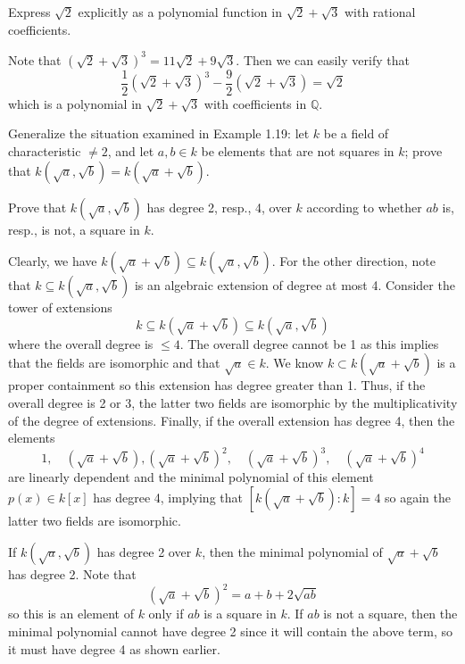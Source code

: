 \documentclass[../../master.tex]{subfiles}
\begin{document}
\begin{problem}
    Express $\sqrt{2}$ explicitly as a polynomial function in $\sqrt{2} + \sqrt{3}$ with rational coefficients.
\end{problem}

\begin{solution}
    Note that $(\sqrt{2} + \sqrt{3})^3 = 11\sqrt{2} + 9\sqrt{3}$.
    Then we can easily verify that
    \[
        \frac{1}{2} (\sqrt{2} + \sqrt{3})^3 - \frac{9}{2} (\sqrt{2} + \sqrt{3}) = \sqrt{2}
    \]
    which is a polynomial in $\sqrt{2} + \sqrt{3}$ with coefficients in $\mathbb{Q}$.
\end{solution}

\begin{problem}
    Generalize the situation examined in Example 1.19:
    let $k$ be a field of characteristic $\neq 2$, and let $a, b \in k$ be elements that are not squares in $k$;
    prove that $k(\sqrt{a}, \sqrt{b}) = k(\sqrt{a} + \sqrt{b})$.

    Prove that $k(\sqrt{a}, \sqrt{b})$ has degree 2, resp., 4, over $k$ according to whether $ab$ is, resp., is not, a square in $k$.
\end{problem}

\begin{solution}
    Clearly, we have $k(\sqrt{a} + \sqrt{b}) \subseteq k(\sqrt{a}, \sqrt{b})$.
    For the other direction, note that $k \subseteq k(\sqrt{a}, \sqrt{b})$ is an algebraic extension of degree at most 4.
    Consider the tower of extensions 
    \[
    k \subseteq k(\sqrt{a} + \sqrt{b}) \subseteq k(\sqrt{a}, \sqrt{b})
    \]
    where the overall degree is $\leq 4$.
    The overall degree cannot be 1 as this implies that the fields are isomorphic and that $\sqrt{a} \in k$.
    We know $k \subset k(\sqrt{a} + \sqrt{b})$ is a proper containment so this extension has degree greater than 1.
    Thus, if the overall degree is 2 or 3, the latter two fields are isomorphic by the multiplicativity of the degree of extensions.
    Finally, if the overall extension has degree 4, then the elements
    \[
        1, \quad (\sqrt{a} + \sqrt{b}), (\sqrt{a} + \sqrt{b})^2, \quad (\sqrt{a} + \sqrt{b})^3, \quad (\sqrt{a} + \sqrt{b})^{4}
    \]
    are linearly dependent and the minimal polynomial of this element $p(x) \in k[x]$ has degree 4, implying that $[k(\sqrt{a} + \sqrt{b}) : k] = 4$ so again the latter two fields are isomorphic.

    If $k(\sqrt{a}, \sqrt{b})$ has degree 2 over $k$, then the minimal polynomial of $\sqrt{a} + \sqrt{b}$ has degree 2.
    Note that
    \[
        (\sqrt{a} + \sqrt{b})^2 = a + b + 2\sqrt{ab}
    \]
    so this is an element of $k$ only if $ab$ is a square in $k$.
    If $ab$ is not a square, then the minimal polynomial cannot have degree 2 since it will contain the above term, so it must have degree 4 as shown earlier.
\end{solution}
\end{document}
